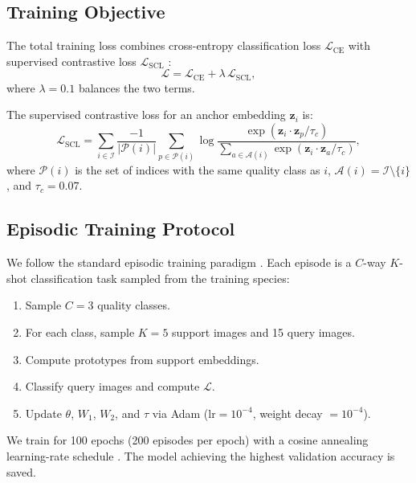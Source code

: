 \documentclass[preprint,12pt,authoryear]{elsarticle}
\begin{document}
\subsection{Training Objective}

The total training loss combines cross-entropy classification loss $\mathcal{L}_{\text{CE}}$
with supervised contrastive loss $\mathcal{L}_{\text{SCL}}$
\citep{khosla2020supervised}:
\begin{equation}
  \mathcal{L} = \mathcal{L}_{\text{CE}} + \lambda \, \mathcal{L}_{\text{SCL}},
\end{equation}
where $\lambda = 0.1$ balances the two terms.

The supervised contrastive loss for an anchor embedding $\mathbf{z}_i$ is:
\begin{equation}
  \mathcal{L}_{\text{SCL}} = \sum_{i \in \mathcal{I}}
  \frac{-1}{|\mathcal{P}(i)|} \sum_{p \in \mathcal{P}(i)}
  \log \frac{\exp(\mathbf{z}_i \cdot \mathbf{z}_p / \tau_c)}
            {\sum_{a \in \mathcal{A}(i)} \exp(\mathbf{z}_i \cdot \mathbf{z}_a / \tau_c)},
\end{equation}
where $\mathcal{P}(i)$ is the set of indices with the same quality class as $i$,
$\mathcal{A}(i) = \mathcal{I} \setminus \{i\}$, and $\tau_c = 0.07$.

\subsection{Episodic Training Protocol}

We follow the standard episodic training paradigm \citep{vinyals2016matching}.
Each episode is a $C$-way $K$-shot classification task sampled from the
training species:

\begin{enumerate}
  \item Sample $C = 3$ quality classes.
  \item For each class, sample $K = 5$ support images and 15 query images.
  \item Compute prototypes from support embeddings.
  \item Classify query images and compute $\mathcal{L}$.
  \item Update $\theta$, $W_1$, $W_2$, and $\tau$ via Adam \citep{kingma2014adam}
        ($\text{lr} = 10^{-4}$, weight decay $= 10^{-4}$).
\end{enumerate}

We train for 100 epochs (200 episodes per epoch) with a cosine annealing
learning-rate schedule \citep{loshchilov2016sgdr}. The model achieving the highest
validation accuracy is saved.
\end{document}
